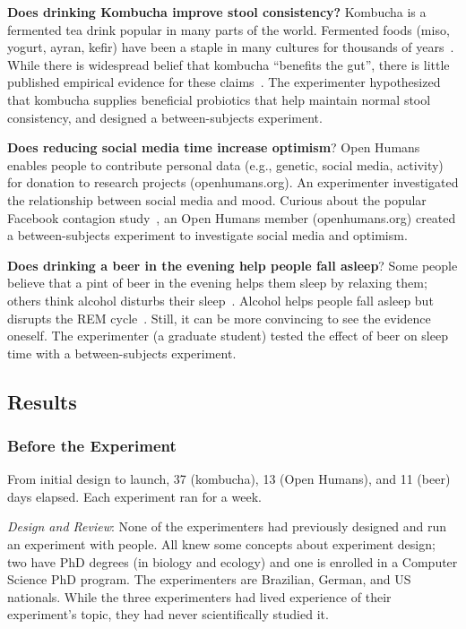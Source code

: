 \textbf{Does drinking Kombucha improve stool consistency?} Kombucha is a fermented tea drink popular in many parts of the world. Fermented foods (miso, yogurt, ayran, kefir) have been a staple in many cultures for thousands of years~\cite{Chilton2015}. While there is widespread belief that kombucha “benefits the gut”, there is little published empirical evidence for these claims~\cite{Ernst2003}. The experimenter hypothesized that kombucha supplies beneficial probiotics that help maintain normal stool consistency, and designed a between-subjects experiment.

\textbf{Does reducing social media time increase optimism}? Open Humans enables people to contribute personal data (e.g., genetic, social media, activity) for donation to research projects (openhumans.org). An experimenter investigated the relationship between social media and mood. Curious about the popular Facebook contagion study~\cite{Coviello2014}, an Open Humans member (openhumans.org) created a between-subjects experiment to investigate social media and optimism.

\textbf{Does drinking a beer in the evening help people fall asleep}? Some people believe that a pint of beer in the evening helps them sleep by relaxing them; others think alcohol disturbs their sleep~\cite{Ph.D.}. Alcohol helps people fall asleep but disrupts the REM cycle~\cite{Ebrahim2013}. Still, it can be more convincing to see the evidence oneself. The experimenter (a graduate student) tested the effect of beer on sleep time with a between-subjects experiment. 

\subsection*{Results}
\subsubsection{Before the Experiment}
From initial design to launch, 37 (kombucha), 13 (Open Humans), and 11 (beer) days elapsed. Each experiment ran for a week.

\textit{Design and Review}: None of the experimenters had previously designed and run an experiment with people. All knew some concepts about experiment design; two have PhD degrees (in biology and ecology) and one is enrolled in a Computer Science PhD program. The experimenters are Brazilian, German, and US nationals. While the three experimenters had lived experience of their experiment's topic, they had never scientifically studied it.

